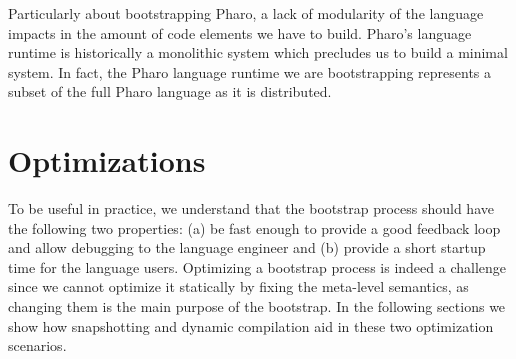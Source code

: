 Particularly about bootstrapping Pharo, a lack of modularity of the language impacts in the amount of code elements we have to build. Pharo's language runtime is historically a monolithic system which precludes us to build a minimal system. In fact, the Pharo language runtime we are bootstrapping represents a subset of the full Pharo language as it is distributed.

\section{Optimizations}\label{sec:optimisations}

To be useful in practice, we understand that the bootstrap process should have the following two properties: (a) be fast enough to provide a good feedback loop and allow debugging to the language engineer and (b) provide a short startup time for the language users. Optimizing a bootstrap process is indeed a challenge since we cannot optimize it statically by fixing the meta-level semantics, as changing them is the main purpose of the bootstrap. In the following sections we show how snapshotting and dynamic compilation aid in these two optimization scenarios. 

